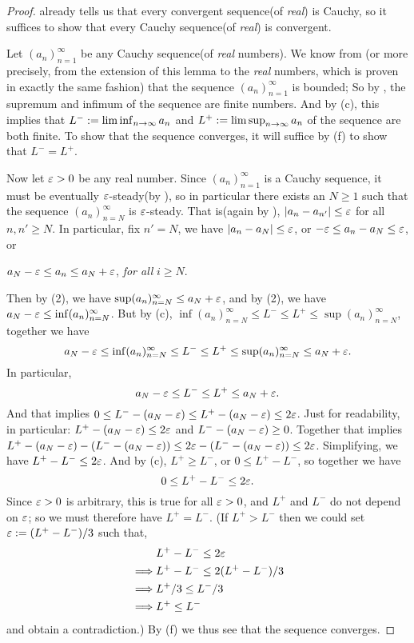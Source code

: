 \begin{proof}
 already tells us that every convergent sequence(of \emph{real}) is Cauchy, so it suffices to show that every Cauchy sequence(of \emph{real}) is convergent.

Let \((a_n)_{n = 1}^{\infty}\) be any Cauchy sequence(of \emph{real} numbers).
We know from  (or more precisely, from the extension of this lemma to the \emph{real} numbers, which is proven in exactly the same fashion) that the sequence \((a_n)_{n = 1}^{\infty}\) is bounded;
So by , the supremum and infimum of the sequence are finite numbers.
And by (c), this implies that \(L^- := \liminf_{n \to \infty} a_n\) and \(L^+ := \limsup_{n \to \infty} a_n\) of the sequence are both finite.
To show that the sequence converges, it will suffice by (f) to show that \(L^- = L^+\).

Now let \(\varepsilon > 0\) be any real number.
Since \((a_n)_{n = 1}^{\infty}\) is a Cauchy
sequence, it must be eventually \(\varepsilon\)-steady(by ), so in particular there exists an \(N \ge 1\) such that the sequence \((a_n)_{n = N}^{\infty}\) is \(\varepsilon\)-steady.
That is(again by ), \(\lvert a_n - a_{n'}\rvert \le \varepsilon\) for all \(n, n' \ge N\).
In particular, fix \(n' = N\), we have \(\lvert a_n - a_N\rvert \le \varepsilon\), or \(-\varepsilon \le a_n - a_N \le \varepsilon\), or
\begin{center}
    \(a_N - \varepsilon \le a_n \le a_N + \varepsilon\), \emph{for all} \(i \ge N\).
\end{center}
Then by (2), we have \(\sup(a_n)_{n = N}^{\infty} \le a_N + \varepsilon\), and by (2), we have \(a_N - \varepsilon \le \inf(a_n)_{n = N}^{\infty}\).
But by (c), \(\inf(a_n)_{n = N}^{\infty} \le L^- \le L^+ \le \sup(a_n)_{n = N}^{\infty}\), together we have
\[
    a_N - \varepsilon \le \inf(a_n)_{n = N}^{\infty} \le L^- \le L^+ \le \sup(a_n)_{n = N}^{\infty} \le a_N + \varepsilon.
\]
In particular,
\[
    a_N - \varepsilon \le L^- \le L^+ \le a_N + \varepsilon.
\]
And that implies \(0 \le L^- - (a_N - \varepsilon) \le L^+ - (a_N - \varepsilon) \le 2\varepsilon\).
Just for readability, in particular: \(L^+ - (a_N - \varepsilon) \le 2\varepsilon\) and \(L^- - (a_N - \varepsilon) \ge 0\).
Together that implies \(L^+ - (a_N - \varepsilon) - (L^- - (a_N - \varepsilon)) \le 2\varepsilon - (L^- - (a_N - \varepsilon)) \le 2\varepsilon\).
Simplifying, we have \(L^+ - L^- \le 2\varepsilon\).
And by (c), \(L^+ \ge L^-\), or \(0 \le L^+ - L^-\), so together we have
\[
    0 \le L^+ - L^- \le 2\varepsilon.
\]
Since \(\varepsilon > 0\) is arbitrary, this is true for all \(\varepsilon > 0\), and \(L^+\) and \(L^-\) do not depend on \(\varepsilon\);
so we must therefore have \(L^+ = L^-\).
(If \(L^+ > L^-\) then we could set \(\varepsilon := (L^+ - L^-)/3\) such that,
\begin{align*}
             & L^+ - L^- \le 2\varepsilon \\
    \implies & L^+ - L^- \le 2(L^+ - L^-)/3 \\
    \implies & L^+/3 \le L^-/3 \\
    \implies & L^+ \le L^-
\end{align*}
and obtain a contradiction.)
By (f) we thus see that the sequence converges.
\end{proof}

